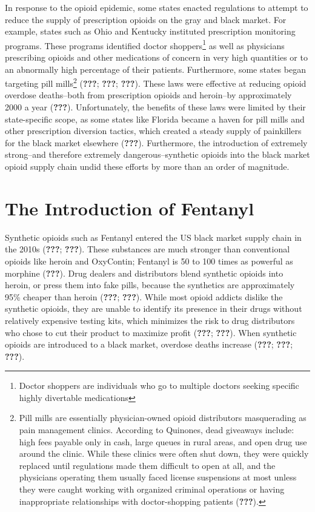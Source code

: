 \documentclass[12pt,twoside]{reedthesis}
\begin{document}
In response to the opioid epidemic, some states enacted regulations to attempt to reduce the supply of prescription opioids on the gray and black market. For example, states such as Ohio and Kentucky instituted prescription monitoring programs. These programs identified doctor shoppers\footnote{Doctor shoppers are individuals who go to multiple doctors seeking specific highly divertable medications} as well as physicians prescribing opioids and other medications of concern in very high quantities or to an abnormally high percentage of their patients. Furthermore, some states began targeting pill mills\footnote{Pill mills are essentially physician-owned opioid distributors masquerading as pain management clinics. According to Quinones, dead giveaways include: high fees payable only in cash, large queues in rural areas, and open drug use around the clinic. While these clinics were often shut down, they were quickly replaced until regulations made them difficult to open at all, and the physicians operating them usually faced license suspensions at most unless they were caught working with organized criminal operations or having inappropriate relationships with doctor-shopping patients ({\textbf{???}}).} ({\textbf{???}}; {\textbf{???}}; {\textbf{???}}). These laws were effective at reducing opioid overdose deaths--both from prescription opioids and heroin--by approximately 2000 a year ({\textbf{???}}). Unfortunately, the benefits of these laws were limited by their state-specific scope, as some states like Florida became a haven for pill mills and other prescription diversion tactics, which created a steady supply of painkillers for the black market elsewhere ({\textbf{???}}). Furthermore, the introduction of extremely strong--and therefore extremely dangerous--synthetic opioids into the black market opioid supply chain undid these efforts by more than an order of magnitude.

\hypertarget{the-introduction-of-fentanyl}{%
\section{The Introduction of Fentanyl}\label{the-introduction-of-fentanyl}}

Synthetic opioids such as Fentanyl entered the US black market supply chain in the 2010s ({\textbf{???}}; {\textbf{???}}). These substances are much stronger than conventional opioids like heroin and OxyContin; Fentanyl is 50 to 100 times as powerful as morphine ({\textbf{???}}). Drug dealers and distributors blend synthetic opioids into heroin, or press them into fake pills, because the synthetics are approximately 95\% cheaper than heroin ({\textbf{???}}; {\textbf{???}}). While most opioid addicts dislike the synthetic opioids, they are unable to identify its presence in their drugs without relatively expensive testing kits, which minimizes the risk to drug distributors who chose to cut their product to maximize profit ({\textbf{???}}; {\textbf{???}}). When synthetic opioids are introduced to a black market, overdose deaths increase ({\textbf{???}}; {\textbf{???}}; {\textbf{???}}).
\end{document}
